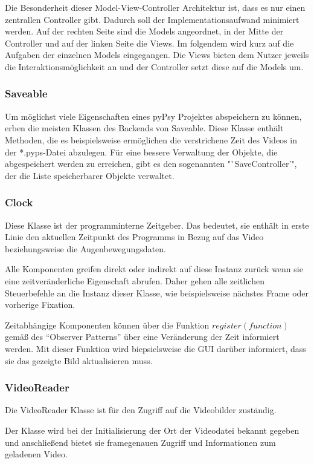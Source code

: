 \documentclass[a4paper,draft]{scrartcl}
\begin{document}
  Die Besonderheit dieser Model-View-Controller Architektur ist, dass es nur einen zentrallen Controller gibt. Dadurch soll der Implementationsaufwand minimiert werden. Auf der rechten Seite sind die Models angeordnet, in der Mitte der Controller und auf der linken Seite die Views. Im folgendem wird kurz auf die Aufgaben der einzelnen Models eingegangen. Die Views bieten dem Nutzer jeweils die Interaktionsmöglichkeit an und der Controller setzt diese auf die Models um.

\subsubsection{Saveable}
Um möglichst viele Eigenschaften eines pyPsy Projektes abspeichern zu können, erben die meisten Klassen des Backends von Saveable. Diese Klasse enthält Methoden, die es beispielsweise ermöglichen die verstrichene Zeit des Videos in der *.pyps-Datei abzulegen. 
Für eine bessere Verwaltung der Objekte, die abgespeichert werden zu erreichen, gibt es den sogenannten "`SaveController'", der die Liste speicherbarer Objekte verwaltet. 

\subsubsection{Clock}
Diese Klasse ist der programminterne Zeitgeber. 
Das bedeutet, sie enthält in erste Linie den aktuellen Zeitpunkt des Programms in Bezug auf das Video beziehungsweise die Augenbewegungsdaten.

Alle Komponenten greifen direkt oder indirekt auf diese Instanz zurück wenn sie eine zeitveränderliche Eigenschaft abrufen. Daher gehen alle zeitlichen Steuerbefehle an die Instanz dieser Klasse, wie beispielsweise nächstes Frame oder vorherige Fixation. 

Zeitabhängige Komponenten können über die Funktion $register(function)$ gemäß des "`Observer Patterns"' über eine Veränderung der Zeit informiert werden.
Mit dieser Funktion wird biepsielsweise die GUI darüber informiert, dass sie das gezeigte Bild aktualisieren muss.

\subsubsection{VideoReader}
Die VideoReader Klasse ist für den Zugriff auf die Videobilder zuständig.

Der Klasse wird bei der Initialisierung der Ort der Videodatei bekannt gegeben und anschließend bietet sie framegenauen Zugriff und Informationen zum geladenen Video.
\end{document}
